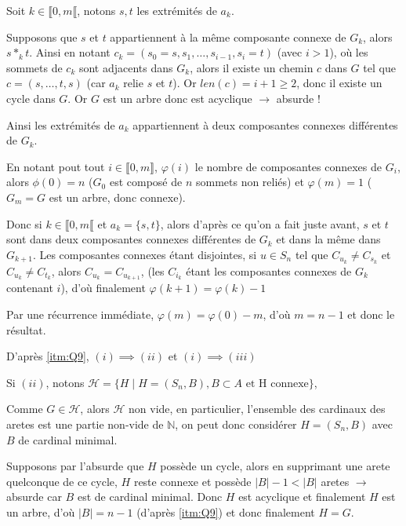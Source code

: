 \documentclass{article}
\newcommand{\bb}[1]{\mathbb{#1}}
\begin{document}
\begin{question}
    \item \label{itm:Q9} Soit $k \in \llbracket 0, m \llbracket$, notons $s, t$ les extrémités
    de $a_k$.

    Supposons que $s$ et $t$ appartiennent à la même composante connexe de
    $G_k$, alors $s \ast_k t$. Ainsi en notant 
    $c_k = (s_0 = s, s_1, \hdots, s_{i - 1}, s_i = t)$ (avec $i > 1$), où les
    sommets de $c_k$ sont adjacents dans $G_k$, alors il existe un chemin $c$ 
    dans $G$ tel que $c = (s, \hdots, t, s)$ (car $a_k$ relie $s$ et $t$). Or
    $len(c) = i + 1 \geqslant 2$, donc il existe un cycle dans $G$. Or $G$ est 
    un arbre donc est acyclique $\rightarrow$ absurde !

    Ainsi les extrémités de $a_k$ appartiennent à deux composantes connexes
    différentes de $G_k$.

    En notant pout tout $i \in \llbracket 0, m \rrbracket$,
    $\varphi(i)$ le nombre de composantes connexes de $G_i$, alors
    $\phi(0) = n$ ($G_0$ est composé de $n$ sommets non reliés) et $\varphi(m) = 1$ ($G_m = G$ est
    un arbre, donc connexe).

    Donc si $k \in \llbracket 0, m \llbracket$ et $a_k = \{s, t\}$, alors
    d'après ce qu'on a fait juste avant, $s$ et $t$ sont dans deux composantes
    connexes différentes de $G_k$ et dans la même dans $G_{k + 1}$. Les
    composantes connexes étant disjointes, si $u \in S_n$ tel que $C_{u_k} \neq
    C_{s_k}$ et $C_{u_k} \neq C_{t_k}$, alors $C_{u_k} = C_{u_{k + 1}}$, 
    (les $C_{i_k}$ étant les composantes connexes de $G_k$ contenant $i$), d'où
    finalement $\varphi(k + 1) = \varphi(k) - 1$

    Par une récurrence immédiate, $\varphi(m) = \varphi(0) - m$, d'où 
    $m = n - 1$ et donc le résultat.

    \item D'après \ref{itm:Q9}, $(i) \implies (ii)$ et $(i) \implies (iii)$
    
    Si $(ii)$, notons 
    $\mathcal{H} = \{ H \mid H = (S_n, B), B \subset A \text{ et H connexe}\}$,

    Comme $G \in \mathcal{H}$, alors $\mathcal{H}$ non vide, en particulier,
    l'ensemble des cardinaux des aretes est une partie non-vide de $\bb{N}$, on 
    peut donc considérer $H = (S_n, B)$ avec $B$ de cardinal minimal. 

    Supposons par l'absurde que $H$ possède un cycle, alors en supprimant une
    arete quelconque de ce cycle, $H$ reste connexe et possède $|B| - 1 < |B|$
    aretes $\rightarrow$ absurde car $B$ est de cardinal minimal. Donc $H$ est
    acyclique et finalement $H$ est un arbre, d'où $|B| = n - 1$
    (d'après \ref{itm:Q9}) et donc finalement $H = G$.


\end{question}
\end{document}
